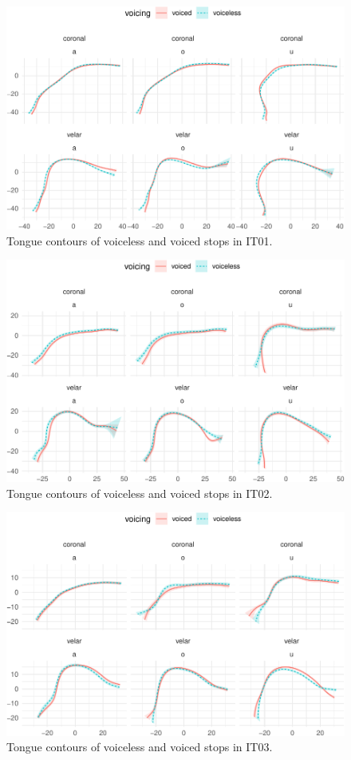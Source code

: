\documentclass[
  11pt,
]{article}
\begin{document}
\begin{figure}

{\centering \includegraphics[width=.8\textwidth]{2018-polar-gam_files/figure-latex/Figure07} 

}

\caption{Tongue contours of voiceless and voiced stops in IT01.}\label{f:Figure07}
\end{figure}

\begin{figure}

{\centering \includegraphics[width=.8\textwidth]{2018-polar-gam_files/figure-latex/Figure08} 

}

\caption{Tongue contours of voiceless and voiced stops in IT02.}\label{f:Figure08}
\end{figure}

\begin{figure}

{\centering \includegraphics[width=.8\textwidth]{2018-polar-gam_files/figure-latex/Figure09} 

}

\caption{Tongue contours of voiceless and voiced stops in IT03.}\label{f:Figure09}
\end{figure}
\end{document}
